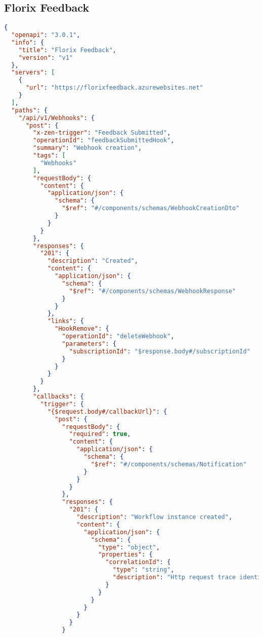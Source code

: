 \subsection{Florix Feedback}
\begin{lstlisting}[language=json,basicstyle=\ttfamily\tiny,numberstyle=\tiny]
{
  "openapi": "3.0.1",
  "info": {
    "title": "Florix Feedback",
    "version": "v1"
  },
  "servers": [
    {
      "url": "https://florixfeedback.azurewebsites.net"
    }
  ],
  "paths": {
    "/api/v1/Webhooks": {
      "post": {
        "x-zen-trigger": "Feedback Submitted",
        "operationId": "feedbackSubmittedHook",
        "summary": "Webhook creation",
        "tags": [
          "Webhooks"
        ],
        "requestBody": {
          "content": {
            "application/json": {
              "schema": {
                "$ref": "#/components/schemas/WebhookCreationDto"
              }
            }
          }
        },
        "responses": {
          "201": {
            "description": "Created",
            "content": {
              "application/json": {
                "schema": {
                  "$ref": "#/components/schemas/WebhookResponse"
                }
              }
            },
            "links": {
              "HookRemove": {
                "operationId": "deleteWebhook",
                "parameters": {
                  "subscriptionId": "$response.body#/subscriptionId"
                }
              }
            }
          }
        },
        "callbacks": {
          "trigger": {
            "{$request.body#/callbackUrl}": {
              "post": {
                "requestBody": {
                  "required": true,
                  "content": {
                    "application/json": {
                      "schema": {
                        "$ref": "#/components/schemas/Notification"
                      }
                    }
                  }
                },
                "responses": {
                  "201": {
                    "description": "Workflow instance created",
                    "content": {
                      "application/json": {
                        "schema": {
                          "type": "object",
                          "properties": {
                            "correlationId": {
                              "type": "string",
                              "description": "Http request trace identifier"
                            }
                          }
                        }
                      }
                    }
                  }
                }

\end{lstlisting}
